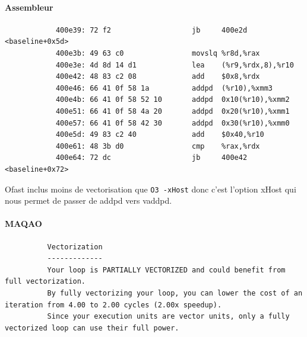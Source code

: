 \documentclass{report}
\begin{document}
        \paragraph{Assembleur}
          \begin{verbatim}
            400e39:	72 f2                	jb     400e2d <baseline+0x5d>
            400e3b:	49 63 c0             	movslq %r8d,%rax
            400e3e:	4d 8d 14 d1          	lea    (%r9,%rdx,8),%r10
            400e42:	48 83 c2 08          	add    $0x8,%rdx
            400e46:	66 41 0f 58 1a       	addpd  (%r10),%xmm3
            400e4b:	66 41 0f 58 52 10    	addpd  0x10(%r10),%xmm2
            400e51:	66 41 0f 58 4a 20    	addpd  0x20(%r10),%xmm1
            400e57:	66 41 0f 58 42 30    	addpd  0x30(%r10),%xmm0
            400e5d:	49 83 c2 40          	add    $0x40,%r10
            400e61:	48 3b d0             	cmp    %rax,%rdx
            400e64:	72 dc                	jb     400e42 <baseline+0x72>
          \end{verbatim}
          Ofast inclus moins de vectorisation que \texttt{O3 -xHost} donc c'est l'option xHost
          qui nous permet de passer de addpd vers vaddpd.
        \paragraph{MAQAO}
        \begin{verbatim}
          Vectorization
          -------------
          Your loop is PARTIALLY VECTORIZED and could benefit from full vectorization.
          By fully vectorizing your loop, you can lower the cost of an iteration from 4.00 to 2.00 cycles (2.00x speedup).
          Since your execution units are vector units, only a fully vectorized loop can use their full power.
        \end{verbatim}
\end{document}
